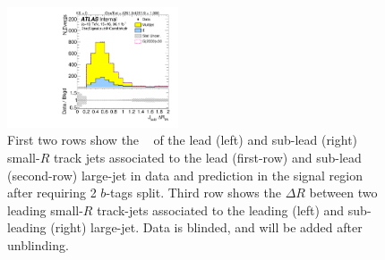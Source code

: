 \begin{figure}[htbp!]
\begin{center}
\includegraphics[width=0.45\textwidth,angle=-90]{figures/boosted/Signal/b77_TwoTag_split_Signal_sublHCand_trk_dr_blind.pdf}
  \caption{First two rows show the \pt~ of the lead (left) and sub-lead (right) small-$R$ track jets associated to the lead (first-row) and sub-lead (second-row) large-\R jet in data and prediction in the signal region after requiring 2 $b$-tags split. Third row shows the $\Delta R$ between two leading small-$R$ track-jets associated to the leading (left) and sub-leading (right) large-\R jet. Data is blinded, and will be added after unblinding. }
  \label{fig:boosted-2bs-signal-blind-ak2}
\end{center}
\end{figure}


